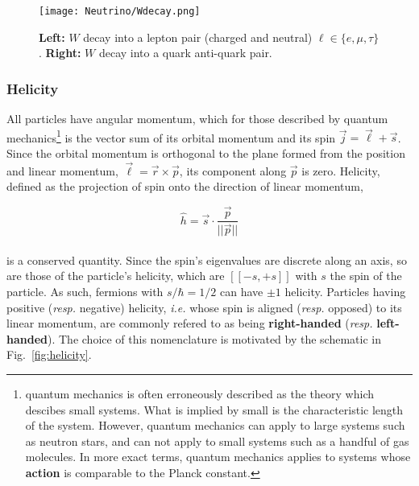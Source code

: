 \begin{figure}
\begin{center}
\texttt{[image: Neutrino/Wdecay.png]}
\caption{\textbf{Left:} $W$ decay into a lepton pair (charged and neutral) $\ell \in \lbrace e, \mu, \tau \rbrace$. \textbf{Right:} $W$ decay into a quark anti-quark pair.}
\label{fig:Wdecay}
\end{center}
\end{figure}


\subsubsection{Helicity}


All particles have angular momentum, which for those described by quantum mechanics\footnote{quantum mechanics is often erroneously described as the theory which descibes small systems. What is implied by small is the characteristic length of the system. However, quantum mechanics can apply to large systems such as neutron stars, and can not apply to small systems such as a handful of gas molecules. In more exact terms, quantum mechanics applies to systems whose \textbf{action} is comparable to the Planck constant.} is the vector sum of its orbital momentum and its spin $\vec{j} = \vec{\ell} + \vec{s}$. Since the orbital momentum is orthogonal to the plane formed from the position and linear momentum, $\vec{\ell} = \vec{r} \times \vec{p}$, its component along $\vec{p}$ is zero. Helicity, defined as the projection of spin onto the direction of linear momentum,

\begin{equation}
\hat{h} = \vec{s} \cdot \frac{\vec{p}}{\vert \vert \vec{p} \vert \vert}
\end{equation} \\ is a conserved quantity. Since the spin's eigenvalues are discrete along an axis, so are those of the particle's helicity, which are $[\![ -s, +s ]\!]$ with $s$ the spin of the particle. As such, fermions with $s/\hbar=1/2$ can have $\pm 1$ helicity. Particles having positive (\textit{resp.} negative) helicity, \textit{i.e.} whose spin is aligned (\textit{resp.} opposed) to its linear momentum, are commonly refered to as being \textbf{right-handed} (\textit{resp.} \textbf{left-handed}). The choice of this nomenclature is motivated by the schematic in Fig.~\ref{fig:helicity}. \\
 
